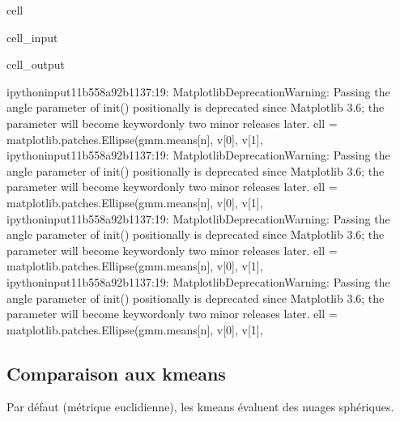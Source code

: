 \documentclass[letterpaper,10pt,french]{sphinxmanual}
\begin{document}
\begin{sphinxuseclass}{cell}
\begin{sphinxuseclass}{cell_input}
\end{sphinxuseclass}
\begin{sphinxuseclass}{cell_output}
\begin{sphinxVerbatim}[commandchars=\\\{\}]
\PYGZlt{}ipython\PYGZhy{}input\PYGZhy{}11\PYGZhy{}b558a92b1137\PYGZgt{}:19: MatplotlibDeprecationWarning: Passing the angle parameter of \PYGZus{}\PYGZus{}init\PYGZus{}\PYGZus{}() positionally is deprecated since Matplotlib 3.6; the parameter will become keyword\PYGZhy{}only two minor releases later.
  ell = matplotlib.patches.Ellipse(gmm.means\PYGZus{}[n], v[0], v[1],
\PYGZlt{}ipython\PYGZhy{}input\PYGZhy{}11\PYGZhy{}b558a92b1137\PYGZgt{}:19: MatplotlibDeprecationWarning: Passing the angle parameter of \PYGZus{}\PYGZus{}init\PYGZus{}\PYGZus{}() positionally is deprecated since Matplotlib 3.6; the parameter will become keyword\PYGZhy{}only two minor releases later.
  ell = matplotlib.patches.Ellipse(gmm.means\PYGZus{}[n], v[0], v[1],
\PYGZlt{}ipython\PYGZhy{}input\PYGZhy{}11\PYGZhy{}b558a92b1137\PYGZgt{}:19: MatplotlibDeprecationWarning: Passing the angle parameter of \PYGZus{}\PYGZus{}init\PYGZus{}\PYGZus{}() positionally is deprecated since Matplotlib 3.6; the parameter will become keyword\PYGZhy{}only two minor releases later.
  ell = matplotlib.patches.Ellipse(gmm.means\PYGZus{}[n], v[0], v[1],
\PYGZlt{}ipython\PYGZhy{}input\PYGZhy{}11\PYGZhy{}b558a92b1137\PYGZgt{}:19: MatplotlibDeprecationWarning: Passing the angle parameter of \PYGZus{}\PYGZus{}init\PYGZus{}\PYGZus{}() positionally is deprecated since Matplotlib 3.6; the parameter will become keyword\PYGZhy{}only two minor releases later.
  ell = matplotlib.patches.Ellipse(gmm.means\PYGZus{}[n], v[0], v[1],
\end{sphinxVerbatim}

\noindent{}

\end{sphinxuseclass}
\end{sphinxuseclass}

\subsection{Comparaison aux k\sphinxhyphen{}means}
\label{\detokenize{clustering:comparaison-aux-k-means}}
\sphinxAtStartPar
Par défaut (métrique euclidienne), les k\sphinxhyphen{}means évaluent des nuages sphériques.
\end{document}
